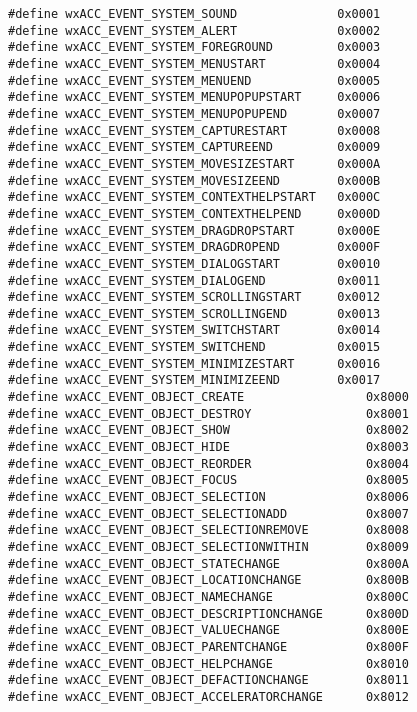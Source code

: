 {\small 
\begin{verbatim}
#define wxACC_EVENT_SYSTEM_SOUND              0x0001
#define wxACC_EVENT_SYSTEM_ALERT              0x0002
#define wxACC_EVENT_SYSTEM_FOREGROUND         0x0003
#define wxACC_EVENT_SYSTEM_MENUSTART          0x0004
#define wxACC_EVENT_SYSTEM_MENUEND            0x0005
#define wxACC_EVENT_SYSTEM_MENUPOPUPSTART     0x0006
#define wxACC_EVENT_SYSTEM_MENUPOPUPEND       0x0007
#define wxACC_EVENT_SYSTEM_CAPTURESTART       0x0008
#define wxACC_EVENT_SYSTEM_CAPTUREEND         0x0009
#define wxACC_EVENT_SYSTEM_MOVESIZESTART      0x000A
#define wxACC_EVENT_SYSTEM_MOVESIZEEND        0x000B
#define wxACC_EVENT_SYSTEM_CONTEXTHELPSTART   0x000C
#define wxACC_EVENT_SYSTEM_CONTEXTHELPEND     0x000D
#define wxACC_EVENT_SYSTEM_DRAGDROPSTART      0x000E
#define wxACC_EVENT_SYSTEM_DRAGDROPEND        0x000F
#define wxACC_EVENT_SYSTEM_DIALOGSTART        0x0010
#define wxACC_EVENT_SYSTEM_DIALOGEND          0x0011
#define wxACC_EVENT_SYSTEM_SCROLLINGSTART     0x0012
#define wxACC_EVENT_SYSTEM_SCROLLINGEND       0x0013
#define wxACC_EVENT_SYSTEM_SWITCHSTART        0x0014
#define wxACC_EVENT_SYSTEM_SWITCHEND          0x0015
#define wxACC_EVENT_SYSTEM_MINIMIZESTART      0x0016
#define wxACC_EVENT_SYSTEM_MINIMIZEEND        0x0017
#define wxACC_EVENT_OBJECT_CREATE                 0x8000
#define wxACC_EVENT_OBJECT_DESTROY                0x8001
#define wxACC_EVENT_OBJECT_SHOW                   0x8002
#define wxACC_EVENT_OBJECT_HIDE                   0x8003
#define wxACC_EVENT_OBJECT_REORDER                0x8004
#define wxACC_EVENT_OBJECT_FOCUS                  0x8005
#define wxACC_EVENT_OBJECT_SELECTION              0x8006
#define wxACC_EVENT_OBJECT_SELECTIONADD           0x8007
#define wxACC_EVENT_OBJECT_SELECTIONREMOVE        0x8008
#define wxACC_EVENT_OBJECT_SELECTIONWITHIN        0x8009
#define wxACC_EVENT_OBJECT_STATECHANGE            0x800A
#define wxACC_EVENT_OBJECT_LOCATIONCHANGE         0x800B
#define wxACC_EVENT_OBJECT_NAMECHANGE             0x800C
#define wxACC_EVENT_OBJECT_DESCRIPTIONCHANGE      0x800D
#define wxACC_EVENT_OBJECT_VALUECHANGE            0x800E
#define wxACC_EVENT_OBJECT_PARENTCHANGE           0x800F
#define wxACC_EVENT_OBJECT_HELPCHANGE             0x8010
#define wxACC_EVENT_OBJECT_DEFACTIONCHANGE        0x8011
#define wxACC_EVENT_OBJECT_ACCELERATORCHANGE      0x8012
\end{verbatim}
}


\label{wxaccessiblewxaccessible}

